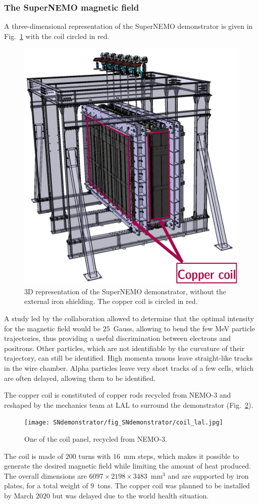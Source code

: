 \subsubsection*{The SuperNEMO magnetic field}

A three-dimensional representation of the SuperNEMO demonstrator is given in Fig.~\ref{fig:coil_3D} with the coil circled in red.
\begin{figure}[h!]
\centering
\includegraphics[height=0.8\textwidth]{SNdemonstrator/fig_SNdemonstrator/coil_3D.pdf}
\caption{3D representation of the SuperNEMO demonstrator, without the external iron shielding.
  The copper coil is circled in red.
\label{fig:coil_3D}}
\end{figure}
A study led by the collaboration allowed to determine that the optimal intensity for the magnetic field would be $25$~Gauss, allowing to bend the few MeV particle trajectories, thus providing a useful discrimination between electrons and positrons.
Other particles, which are not identifiable by the curvature of their trajectory, can still be identified.
High momenta muons leave straight-like tracks in the wire chamber.
Alpha particles leave very short tracks of a few cells, which are often delayed, allowing them to be identified.


The copper coil is constituted of copper rods recycled from NEMO-$3$ and reshaped by the mechanics team at LAL to surround the demonstrator (Fig.~\ref{fig:coil_LAL}).
\begin{figure}[h!]
\centering
\texttt{[image: SNdemonstrator/fig\_SNdemonstrator/coil\_lal.jpg]}
\caption{One of the coil panel, recycled from NEMO-$3$.
\label{fig:coil_LAL}}
\end{figure}
The coil is made of $200$ turns with $16$~mm steps, which makes it possible to generate the desired magnetic field while limiting the amount of heat produced.
The overall dimensions are $6097\times2198\times3483$~mm$^{3}$ and are supported by iron plates, for a total weight of $9$~tons.
The copper coil was planned to be installed by March $2020$ but was delayed due to the world health situation.

